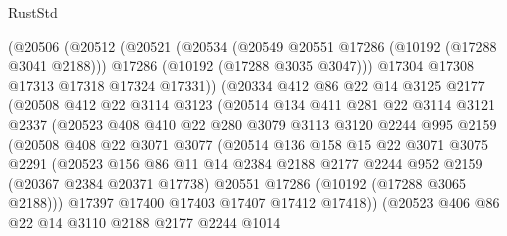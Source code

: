 \begin{lexlean}{RustStd}
\begin{coremodule}
            (@20506
              (@20512
                (@20521
                  (@20534
                    (@20549 @20551 @17286 (@10192 (@17288 @3041 @2188)))
                    @17286
                    (@10192 (@17288 @3035 @3047)))
                  @17304
                  @17308
                  @17313
                  @17318
                  @17324
                  @17331))
              (@20334
                @412
                @86
                @22
                @14
                @3125
                @2177
                (@20508
                  @412
                  @22
                  @3114
                  @3123
                  (@20514
                    @134
                    @411
                    @281
                    @22
                    @3114
                    @3121
                    @2337
                    (@20523
                      @408
                      @410
                      @22
                      @280
                      @3079
                      @3113
                      @3120
                      @2244
                      @995
                      @2159
                      (@20508
                        @408
                        @22
                        @3071
                        @3077
                        (@20514
                          @136
                          @158
                          @15
                          @22
                          @3071
                          @3075
                          @2291
                          (@20523
                            @156
                            @86
                            @11
                            @14
                            @2384
                            @2188
                            @2177
                            @2244
                            @952
                            @2159
                            (@20367 @2384 @20371 @17738)
                            @20551
                            @17286
                            (@10192 (@17288 @3065 @2188)))
                          @17397
                          @17400
                          @17403
                          @17407
                          @17412
                          @17418))
                      (@20523
                        @406
                        @86
                        @22
                        @14
                        @3110
                        @2188
                        @2177
                        @2244
                        @1014

\end{coremodule}
\end{lexlean}

